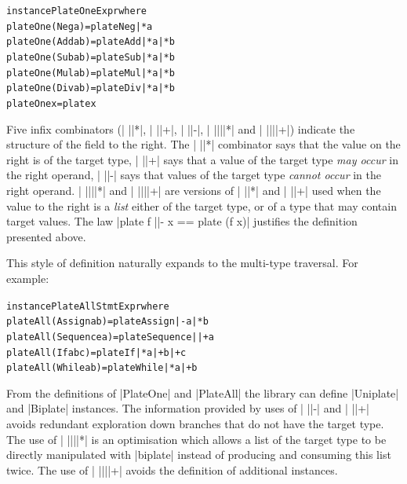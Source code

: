 \documentclass[preprint]{sigplanconf}
\newenvironment{code}{\begin{alltt}\small}{\end{alltt}}
\begin{document}

\begin{code}
instance PlateOne Expr where
    plateOne (Neg  a    )  = plate Neg  |* a
    plateOne (Add  a b  )  = plate Add  |* a |* b
    plateOne (Sub  a b  )  = plate Sub  |* a |* b
    plateOne (Mul  a b  )  = plate Mul  |* a |* b
    plateOne (Div  a b  )  = plate Div  |* a |* b
    plateOne x             = plate x
\end{code}

Five infix combinators (| ||*|, | ||+|, | ||-|, | ||||*| and | ||||+|) indicate the structure of the field to the right. The | ||*| combinator says that the value on the right is of the target type, | ||+| says that a value of the target type \textit{may occur} in the right operand, | ||-| says that values of the target type \textit{cannot occur} in the right operand. | ||||*| and | ||||+| are versions of | ||*| and | ||+| used when the value to the right is a \textit{list} either of the target type, or of a type that may contain target values. The law |plate f ||- x == plate (f x)| justifies the definition presented above.

This style of definition naturally expands to the multi-type traversal. For example:

\begin{code}
instance PlateAll Stmt Expr where
    plateAll (Assign    a b    ) = plate Assign    |-   a |*  b
    plateAll (Sequence  a      ) = plate Sequence  ||+  a
    plateAll (If        a b c  ) = plate If        |*   a |+  b |+ c
    plateAll (While     a b    ) = plate While     |*   a |+  b
\end{code}

From the definitions of |PlateOne| and |PlateAll| the library can define |Uniplate| and |Biplate| instances. The information provided by uses of | ||-| and | ||+| avoids redundant exploration down branches that do not have the target type. The use of | ||||*| is an optimisation which allows a list of the target type to be directly manipulated with |biplate| instead of producing and consuming this list twice. The use of | ||||+| avoids the definition of additional instances.
\end{document}

